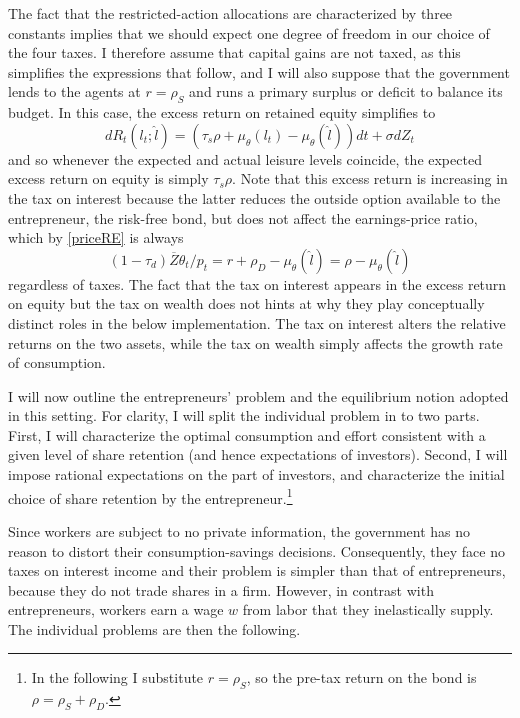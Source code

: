 \documentclass[11pt]{article}
\theoremstyle{plain}
\begin{document}
The fact that the restricted-action allocations are characterized by three constants implies that we should expect one degree of freedom in our choice of the four taxes. I therefore assume that capital gains are not taxed, as this simplifies the expressions that follow, and I will also suppose that the government lends to the agents at $r = \rho_S$ and runs a primary surplus or deficit to balance its budget. In this case, the excess return on retained equity simplifies to
\begin{equation}
dR_t(l_t;\hat{l}) = (\tau_s \rho + \mu_{\theta}(l_t) - \mu_{\theta}(\hat{l}))dt + \sigma dZ_t
\label{return_simp}
\end{equation}
and so whenever the expected and actual leisure levels coincide, the expected excess return on equity is simply $\tau_s \rho$. Note that this excess return is increasing in the tax on interest because the latter reduces the outside option available to the entrepreneur, the risk-free bond, but does not affect the earnings-price ratio, which by \eqref{priceRE} is always 
$$ %
(1-\tau_d)\overline{Z}\theta_t/p_t = r + \rho_D - \mu_{\theta}(\hat{l}) = \rho - \mu_{\theta}(\hat{l})
$$
regardless of taxes. The fact that the tax on interest appears in the excess return on equity but the tax on wealth does not hints at why they play conceptually distinct roles in the below implementation. The tax on interest alters the relative returns on the two assets, while the tax on wealth simply affects the growth rate of consumption. 


I will now outline the entrepreneurs' problem and the equilibrium notion adopted in this setting. For clarity, I will split the individual problem in to two parts. First, I will characterize the optimal consumption and effort consistent with a given level of share retention (and hence expectations of investors). Second, I will impose rational expectations on the part of investors, and characterize the initial choice of share retention by the entrepreneur.\footnote{In the following I substitute $r = \rho_S$, so the pre-tax return on the bond is $\rho = \rho_S + \rho_D$.}

Since workers are subject to no private information, the government has no reason to distort their consumption-savings decisions. Consequently, they face no taxes on interest income and their problem is simpler than that of entrepreneurs, because they do not trade shares in a firm. However, in contrast with entrepreneurs, workers earn a wage $w$ from labor that they inelastically supply. The individual problems are then the following.
\end{document}
